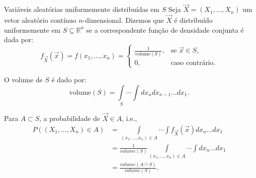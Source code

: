 \begin{frame}{Variáveis aleatórias uniformemente distribuídas em $S$}
Seja $\Vec{X} = (X_1, \ldots, X_n)$ um vetor aleatório contínuo $n$-dimensional. Dizemos que $\Vec{X}$ é distribuído uniformemente em $S \subseteq \mathbb{R}^n$ se a correspondente função de densidade conjunta é dada por:
\[
f_{\Vec{X}}(\Vec{x}) = f(x_1, \ldots, x_n) =
\begin{cases}
	\frac{1}{\text{volume}(S)}, & \text{se } \Vec{x} \in S, \\
	0, & \text{caso contrário.}
\end{cases}
\]

O volume de $S$ é dado por:
\[
\text{volume}(S) = \int\limits_S \cdots \int dx_n dx_{n-1} \ldots dx_1.
\]

Para $A\subset S$, a probabilidade de $\Vec{X} \in A$, i.e.,
\begin{align*}
	P((X_1,\ldots,X_n)\in A)&=\int\limits_{(x_1,\ldots, x_n)\in A}\cdots \int f_{\Vec{X}}(\Vec{x}) dx_n \ldots dx_1\\
	&=\frac{1}{volume (S)} \int\limits_{(x_1,\ldots, x_n)\in A}\cdots \int dx_n \ldots dx_1\\
	&=\frac{volume (A\cap S)}{volume(S)}.
\end{align*} 

\end{frame}



\begin{frame}
%	
${}$

\vspace{3cm}
\end{frame}	

